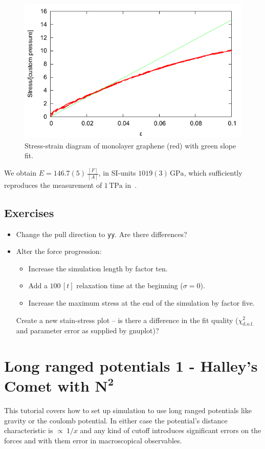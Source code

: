 \begin{figure}[h]
    \centering
    \includegraphics{visuals/graphene.pdf}
    \caption{Stress-strain diagram of monolayer graphene (red) with green slope fit.}
\end{figure}

We obtain $E=146.7(5)\,\frac{[F]}{[A]}$, in SI-units $1019(3)\,\textrm{GPa}$, which
sufficiently reproduces the measurement of $1\,\textrm{TPa}$ in~\cite{egraphene}.

\subsection{Exercises}
\begin{itemize}
    \item Change the pull direction to \texttt{yy}. Are there differences?
    \item Alter the force progression:
    \begin{itemize}
        \item Increase the simulation length by factor ten.
        \item Add a $100\,[t]$ relaxation time at the beginning ($\sigma=0$).
        \item Increase the maximum stress at the end of the simulation by factor five.
    \end{itemize}
    Create a new stain-stress plot -- is there a difference in the fit quality
    ($\chi^2_\textrm{d.o.f.}$ and parameter error as supplied by gnuplot)?
\end{itemize}

\section{Long ranged potentials 1 - Halley's Comet with $\mathbf{N^2}$}
This tutorial covers how to set up simulation to use long ranged
potentials like gravity or the coulomb potential. In either case the
potential's distance characteristic is $\propto\ 1/x$ and any kind of
cutoff introduces significant errors on the forces and with them error
in macroscopical observables.

